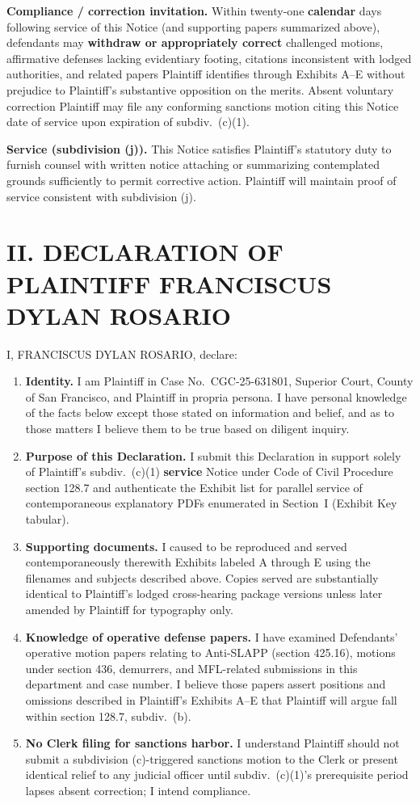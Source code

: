 \textbf{Compliance / correction invitation.} Within twenty-one \textbf{calendar} days following service of this Notice (and supporting papers summarized above), defendants may \textbf{withdraw or appropriately correct} challenged motions, affirmative defenses lacking evidentiary footing, citations inconsistent with lodged authorities, and related papers Plaintiff identifies through Exhibits A--E without prejudice to Plaintiff's substantive opposition on the merits. Absent voluntary correction Plaintiff may file any conforming sanctions motion citing this Notice date of service upon expiration of subdiv.\ (c)(1).

\textbf{Service (subdivision (j)).} This Notice satisfies Plaintiff's statutory duty to furnish counsel with written notice attaching or summarizing contemplated grounds sufficiently to permit corrective action. Plaintiff will maintain proof of service consistent with subdivision (j).

\section*{II. DECLARATION OF PLAINTIFF FRANCISCUS DYLAN ROSARIO}

I, FRANCISCUS DYLAN ROSARIO, declare:

\begin{enumerate}
\item \textbf{Identity.} I am Plaintiff in Case No.\ CGC-25-631801, Superior Court, County of San Francisco, and Plaintiff in propria persona. I have personal knowledge of the facts below except those stated on information and belief, and as to those matters I believe them to be true based on diligent inquiry.
\item \textbf{Purpose of this Declaration.} I submit this Declaration in support solely of Plaintiff's subdiv.\ (c)(1) \textbf{service} Notice under Code of Civil Procedure section 128.7 and authenticate the Exhibit list for parallel service of contemporaneous explanatory PDFs enumerated in Section~I (Exhibit Key tabular).
\item \textbf{Supporting documents.} I caused to be reproduced and served contemporaneously therewith Exhibits labeled A through E using the filenames and subjects described above. Copies served are substantially identical to Plaintiff's lodged cross-hearing package versions unless later amended by Plaintiff for typography only.
\item \textbf{Knowledge of operative defense papers.} I have examined Defendants' operative motion papers relating to Anti-SLAPP (section 425.16), motions under section 436, demurrers, and MFL-related submissions in this department and case number. I believe those papers assert positions and omissions described in Plaintiff's Exhibits A--E that Plaintiff will argue fall within section 128.7, subdiv.\ (b).
\item \textbf{No Clerk filing for sanctions harbor.} I understand Plaintiff should not submit a subdivision (c)-triggered sanctions motion to the Clerk or present identical relief to any judicial officer until subdiv.\ (c)(1)'s prerequisite period lapses absent correction; I intend compliance.
\end{enumerate}

